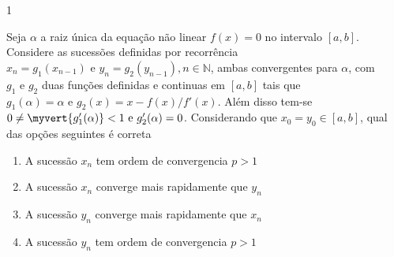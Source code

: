 \documentclass[CN_A-Tests_Resolutions.tex]{subfiles}
\begin{document}
\begin{questionBox}1{} %

  Seja \(\alpha\) a raiz única da equação não linear \(f(x)=0\) no intervalo \([a,b]\). Considere as sucessões definidas por recorrência \(x_n=g_1(x_{n-1})\text{ e }y_n=g_2(y_{n-1}),n\in\mathbb{N}\), ambas convergentes para \(\alpha\), com \(g_1\text{ e }g_2\) duas funções definidas e continuas em \([a,b]\) tais que \(g_1(\alpha)=\alpha\text{ e }g_2(x)=x-f(x)/f'(x)\). Além disso tem-se \(0\neq\myvert{g'_1(\alpha)}<1\text{ e }g'_2(\alpha)=0\). Considerando que \(x_0=y_0\in{[a,b]}\), qual das opções seguintes é correta
  \begin{enumerate}[label=\alph{enumi}.]
    \item A sucessão \textcolor{GraphA11}{\(x_n\)} tem ordem de convergencia \textcolor{GraphA15}{\(p>1\)}
    \item A sucessão \textcolor{GraphA11}{\(x_n\)} converge mais rapidamente que \textcolor{GraphA17}{\(y_n\)}
    \item A sucessão \textcolor{GraphA13}{\(y_n\)} converge mais rapidamente que \textcolor{GraphA19}{\(x_n\)}
    \item A sucessão \textcolor{GraphA13}{\(y_n\)} tem ordem de convergencia \textcolor{GraphA15}{\(p>1\)}
  \end{enumerate}


\end{questionBox}
\end{document}
